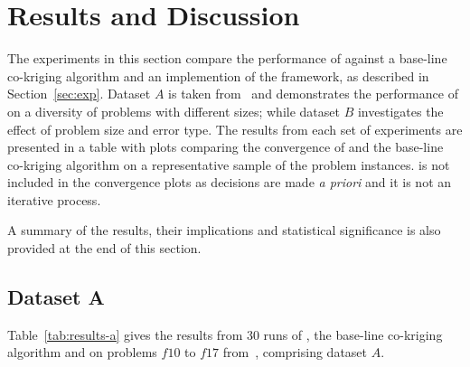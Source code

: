 \section{Results and Discussion}\label{sec:results}
The experiments in this section compare the performance of \AlgName{} against a base-line co-kriging algorithm and an implemention of the \motos{} framework, as described in Section~\ref{sec:exp}. Dataset $A$ is taken from~\cite{lv2021multi} and demonstrates the performance of \AlgName{} on a diversity of problems with different sizes; while dataset $B$ investigates the effect of problem size and error type. The results from each set of experiments are presented in a table with plots comparing the convergence of \AlgName{} and the base-line co-kriging algorithm on a representative sample of the problem instances. \motos{} is not included in the convergence plots as decisions are made \emph{a priori} and it is not an iterative process.

A summary of the results, their implications and statistical significance is also provided at the end of this section.

\subsection*{Dataset A}

Table~\ref{tab:results-a} gives the results from 30 runs of \AlgName{}, the base-line co-kriging algorithm and \motos{} on problems $f10$ to $f17$ from~\cite{lv2021multi}, comprising dataset $A$.

